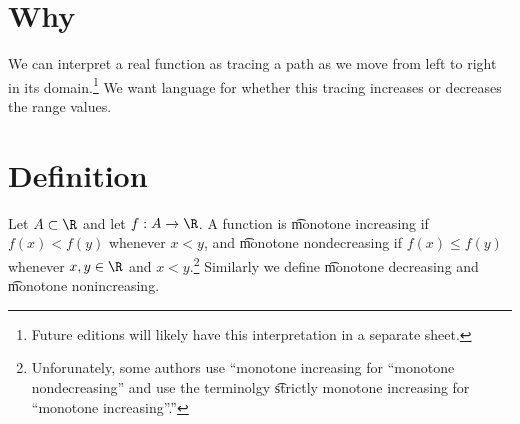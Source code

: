 
\section*{Why}

We can interpret a real function as tracing a path as we move from left to right in its domain.\footnote{Future editions will likely have this interpretation in a separate sheet.}
We want language for whether this tracing increases or decreases the range values.

\section*{Definition}

Let $A \subset \R $ and let $f: A \to \R $.
A function is \t{monotone increasing} if $f(x) < f(y)$ whenever $x < y$, and \t{monotone nondecreasing} if $f(x) \leq f(y)$ whenever $x, y \in \R $ and $x < y$.\footnote{Unforunately, some authors use ``monotone increasing for ``monotone nondecreasing'' and use the terminolgy \t{strictly monotone increasing} for ``monotone increasing''.''}
Similarly we define \t{monotone decreasing} and \t{monotone nonincreasing}.

\blankpage